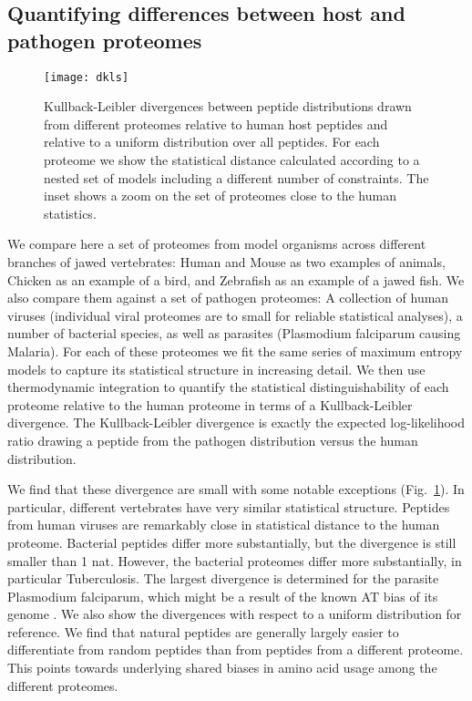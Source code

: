 \documentclass[superscriptaddress,twocolumn,pre]{revtex4}
\newcommand{\<}{\langle}
\renewcommand{\>}{\rangle}
\begin{document}
\subsection{Quantifying differences between host and pathogen proteomes}

\begin{figure}
    \texttt{[image: dkls]}
    \caption{Kullback-Leibler divergences between peptide distributions drawn from different proteomes relative to human host peptides and relative to a uniform distribution over all peptides. For each proteome we show the statistical distance calculated according to a nested set of models including a different number of constraints. The inset shows a zoom on the set of proteomes close to the human statistics.
    \label{figdkls}
    }
\end{figure}

We compare here a set of proteomes from model organisms across different branches of jawed vertebrates: Human and Mouse as two examples of animals, Chicken as an example of a bird, and Zebrafish as an example of a jawed fish. We also compare them against a set of pathogen proteomes: A collection of human viruses (individual viral proteomes are to small for reliable statistical analyses), a number of bacterial species, as well as parasites (Plasmodium falciparum causing Malaria). For each of these proteomes we fit the same series of maximum entropy models to capture its statistical structure in increasing detail. We then use thermodynamic integration to quantify the statistical distinguishability of each proteome relative to the human proteome in terms of a Kullback-Leibler divergence. The Kullback-Leibler divergence is exactly the expected log-likelihood ratio drawing a peptide from the pathogen distribution versus the human distribution. 

We find that these divergence are small with some notable exceptions (Fig.~\ref{figdkls}). In particular, different vertebrates have very similar statistical structure. Peptides from human viruses are remarkably close in statistical distance to the human proteome. Bacterial peptides differ more substantially, but the divergence is still smaller than 1 nat. However, the bacterial proteomes differ more substantially, in particular Tuberculosis. The largest divergence is determined for the parasite Plasmodium falciparum, which might be a result of the known AT bias of its genome \cite{Hamilton2017}. We also show the divergences with respect to a uniform distribution for reference. We find that natural peptides are generally largely easier to differentiate from random peptides than from peptides from a different proteome. This points towards underlying shared biases in amino acid usage among the different proteomes.
\end{document}
